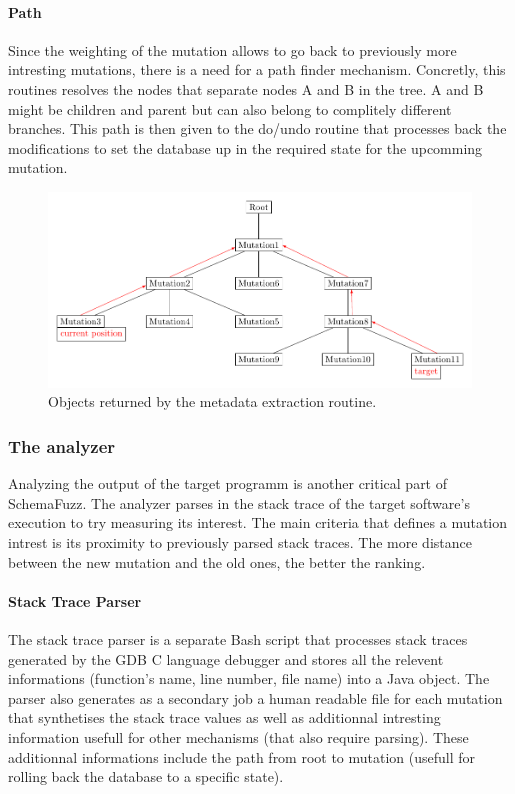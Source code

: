 \documentclass{article}
\begin{document}
\begin{empfile}
				\paragraph{Path}
Since the weighting of the mutation allows to go back to previously more intresting mutations, 
there is a need for a path finder mechanism. Concretly, this routines resolves the nodes that separate nodes A and B in the tree. A and B might be children and parent but can also belong to complitely different branches. This path is then given to the do/undo routine that processes back the modifications to set the database up in the required state for the upcomming mutation. 

\begin{figure} 
\centering
\includegraphics[scale=1]{CommonAncestorDiagram.pdf}
\caption{Objects returned by the metadata extraction routine.}
\end{figure}
			\subsubsection{The analyzer}
Analyzing the output of the target programm is another critical part of SchemaFuzz. The analyzer parses in the stack trace of the target software's execution to try measuring its interest. The main criteria that defines a mutation intrest is its proximity to previously parsed stack traces. The more distance between the new mutation and the old ones, the better the ranking. 
				\paragraph{Stack Trace Parser}
The stack trace parser is a separate Bash script that processes stack traces generated by the GDB C language debugger and stores all the relevent informations (function's name, line number, file name) into a Java object. The parser also generates as a secondary job a human readable file for each mutation that synthetises the stack trace values as well as additionnal intresting information usefull for other mechanisms (that also require parsing). These additionnal informations include the path from root to mutation (usefull for rolling back the database to a specific state).

\end{empfile}
\end{document}

